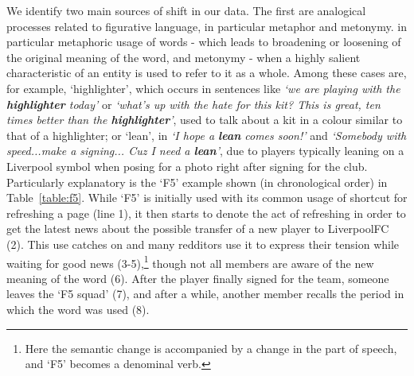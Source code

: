 
We identify two main sources of shift in our data.  The first are
analogical processes related to figurative language, in particular
metaphor and metonymy.
   in particular metaphoric usage of words - which leads to broadening or loosening of the original meaning of the word, and metonymy - when a highly salient characteristic of an entity is used to refer to it as a whole. Among these cases are, for example, `highlighter', which occurs in sentences like \textit{`we are playing with the \textbf{highlighter} today'} or \textit{`what's up with the hate for this kit? This is great, ten times better than the \textbf{highlighter}'}, used to talk about a kit in a colour similar to that of a highlighter; or `lean', in \textit{`I hope a \textbf{lean} comes soon!'} and \textit{`Somebody with speed...make a signing... Cuz I need a \textbf{lean}'}, due to players typically leaning on a Liverpool symbol when posing for a photo right after signing for the club. Particularly explanatory is the `F5' example shown (in chronological order) in
Table~\ref{table:f5}. While `F5' is initially used with its common usage of shortcut for refreshing a page (line 1), it then starts to denote the act of refreshing in order to get the latest news about the possible transfer of a new player to LiverpoolFC (2). This use catches on and many redditors use it to express their tension while waiting for good news (3-5),\footnote{Here the semantic change is accompanied by a change in the part of speech, and `F5' becomes a denominal verb.}
though not all members are aware of the new meaning of the word (6). After the player finally signed for the team, someone leaves the `F5 squad' (7), and after a while, another member recalls the period in which the word was used (8).

